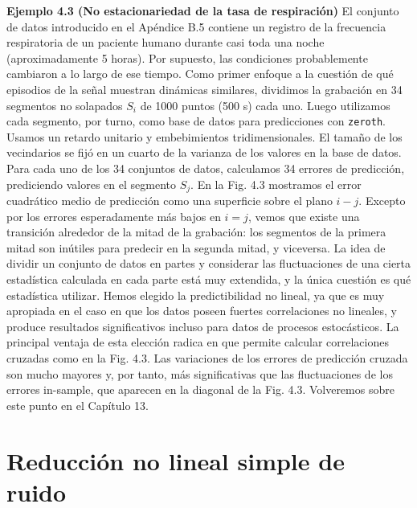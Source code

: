 \documentclass[10pt,a4paper]{book}
\begin{document}
\textbf{Ejemplo 4.3 (No estacionariedad de la tasa de respiración)} El conjunto de datos introducido en el Apéndice B.5 contiene un registro de la frecuencia respiratoria de un paciente humano durante casi toda una noche (aproximadamente 5 horas). Por supuesto, las condiciones probablemente cambiaron a lo largo de ese tiempo. Como primer enfoque a la cuestión de qué episodios de la señal muestran dinámicas similares, dividimos la grabación en 34 segmentos no solapados $S_i$ de 1000 puntos (500 s) cada uno. Luego utilizamos cada segmento, por turno, como base de datos para predicciones con \texttt{zeroth}. Usamos un retardo unitario y embebimientos tridimensionales. El tamaño de los vecindarios se fijó en un cuarto de la varianza de los valores en la base de datos. Para cada uno de los 34 conjuntos de datos, calculamos 34 errores de predicción, prediciendo valores en el segmento $S_j$. En la Fig. 4.3 mostramos el error cuadrático medio de predicción como una superficie sobre el plano $i-j$. Excepto por los errores esperadamente más bajos en $i = j$, vemos que existe una transición alrededor de la mitad de la grabación: los segmentos de la primera mitad son inútiles para predecir en la segunda mitad, y viceversa. La idea de dividir un conjunto de datos en partes y considerar las fluctuaciones de una cierta estadística calculada en cada parte está muy extendida, y la única cuestión es qué estadística utilizar. Hemos elegido la predictibilidad no lineal, ya que es muy apropiada en el caso en que los datos poseen fuertes correlaciones no lineales, y produce resultados significativos incluso para datos de procesos estocásticos. La principal ventaja de esta elección radica en que permite calcular correlaciones cruzadas como en la Fig. 4.3. Las variaciones de los errores de predicción cruzada son mucho mayores y, por tanto, más significativas que las fluctuaciones de los errores in-sample, que aparecen en la diagonal de la Fig. 4.3. Volveremos sobre este punto en el Capítulo 13.

\newpage

\section{Reducción no lineal simple de ruido}
\end{document}
